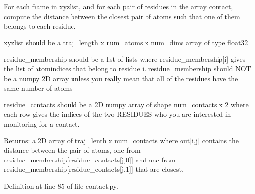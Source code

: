 \-For each frame in xyzlist, and for each pair of residues in the array contact, compute the distance between the closest pair of atoms such that one of them belongs to each residue. 

xyzlist should be a traj\-\_\-length x num\-\_\-atoms x num\-\_\-dims array of type float32

residue\-\_\-membership should be a list of lists where residue\-\_\-membership\mbox{[}i\mbox{]} gives the list of atomindices that belong to residue i. residue\-\_\-membership should \-N\-O\-T be a numpy 2\-D array unless you really mean that all of the residues have the same number of atoms

residue\-\_\-contacts should be a 2\-D numpy array of shape num\-\_\-contacts x 2 where each row gives the indices of the two \-R\-E\-S\-I\-D\-U\-E\-S who you are interested in monitoring for a contact.

\-Returns\-: a 2\-D array of traj\-\_\-lenth x num\-\_\-contacts where out\mbox{[}i,j\mbox{]} contains the distance between the pair of atoms, one from residue\-\_\-membership\mbox{[}residue\-\_\-contacts\mbox{[}j,0\mbox{]}\mbox{]} and one from residue\-\_\-membership\mbox{[}residue\-\_\-contacts\mbox{[}j,1\mbox{]}\mbox{]} that are closest. 

\-Definition at line 85 of file contact.\-py.

